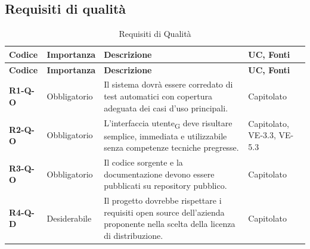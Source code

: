 \subsection{Requisiti di qualità}
\begin{longtable}{|p{2.5cm}|p{2.2cm}|p{6.8cm}|p{2.7cm}|}
	\caption{Requisiti di Qualità} \\
	\hline
	\rowcolor{primarycolor!10}
	\textbf{Codice} & \textbf{Importanza} & \textbf{Descrizione} & \textbf{UC, Fonti} \\
	\hline
	\endfirsthead
	\hline
	\rowcolor{primarycolor!10}
	\textbf{Codice} & \textbf{Importanza} & \textbf{Descrizione} & \textbf{UC, Fonti} \\
	\hline
	\endhead

	\textbf{R1-Q-O} & Obbligatorio & Il sistema dovrà essere corredato di test automatici con copertura adeguata dei casi d'uso principali. & Capitolato \\ \hline
	\textbf{R2-Q-O} & Obbligatorio & L'interfaccia utente\textsubscript{G} deve risultare semplice, immediata e utilizzabile senza competenze tecniche pregresse. & Capitolato, VE-3.3, VE-5.3 \\ \hline
	\textbf{R3-Q-O} & Obbligatorio & Il codice sorgente e la documentazione devono essere pubblicati su repository pubblico. & Capitolato \\ \hline
	\textbf{R4-Q-D} & Desiderabile & Il progetto dovrebbe rispettare i requisiti open source dell'azienda proponente nella scelta della licenza di distribuzione. & Capitolato \\ \hline

\end{longtable}

